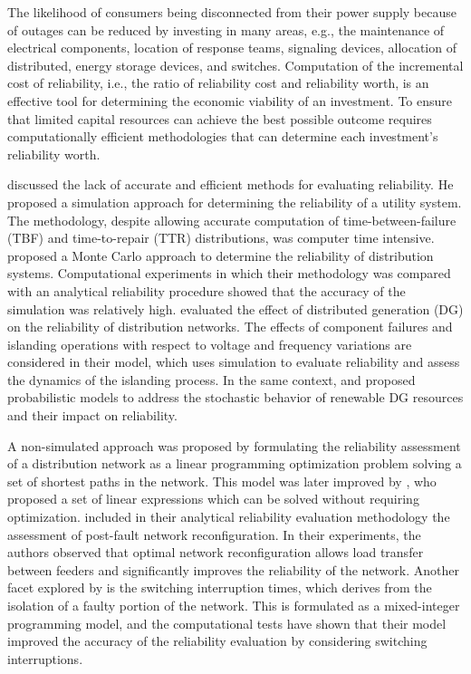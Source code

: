 \documentclass{article}
\begin{document}
The likelihood of consumers being disconnected from their power supply because of outages can be reduced by investing in many areas, e.g., the maintenance of electrical components, location of response teams, signaling devices, allocation of distributed, energy storage devices, and switches.
Computation of the incremental cost of reliability, i.e., the ratio of reliability cost and reliability worth, is an effective tool for determining the economic viability of an investment. 
To ensure that limited capital resources can achieve the best possible outcome requires computationally efficient methodologies that can determine each investment's reliability worth.

\cite{chismant1998} discussed the lack of accurate and efficient methods for evaluating reliability. He proposed a simulation approach for determining the reliability of a utility system. The methodology, despite allowing accurate computation of time-between-failure (TBF) and time-to-repair (TTR) distributions, was computer time intensive.
\cite{Heydt2010}  proposed a Monte Carlo approach to determine the reliability of distribution systems. Computational experiments in which their methodology was compared with an analytical reliability procedure showed that the accuracy of the simulation was relatively high.
\cite{RochaEtal2017} evaluated the effect of distributed generation (DG) on the reliability of distribution networks. The effects of component failures and islanding operations with respect to voltage and frequency variations are considered in their model, which uses simulation to evaluate reliability and assess the dynamics of the islanding process. 
In the same context, \cite{ContiNicolosiRizzo2012} and \cite{AdefaratiBansal2017} proposed probabilistic models to address the stochastic behavior of renewable DG resources and their impact on reliability. 


A non-simulated approach was proposed by  \cite{DelgadoContrerasArroyo2018} formulating the reliability assessment of a distribution network as a linear programming optimization problem solving a set of shortest paths in the network. This model was 
 later improved by \cite{TabaresEtal2019}, who proposed a set of linear expressions which can be solved without requiring optimization. 
\cite{LiEtAl2020a} included in their analytical reliability evaluation methodology the assessment of post-fault network reconfiguration. In their experiments, the authors observed that optimal network reconfiguration allows load  transfer  between feeders and significantly improves the reliability of the network. Another facet explored by \cite{Contreras2020} is the switching interruption times, which derives from the isolation of a faulty portion of the network. This is formulated as a mixed-integer programming model, and the computational tests have shown that their model improved the accuracy of the reliability evaluation by considering switching interruptions.
\end{document}
